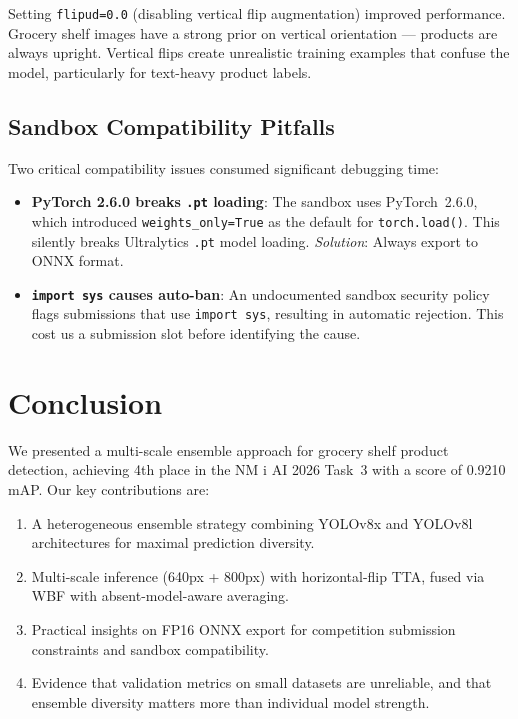 \documentclass[11pt,a4paper]{article}
\begin{document}
Setting \texttt{flipud=0.0} (disabling vertical flip augmentation) improved performance.
Grocery shelf images have a strong prior on vertical orientation --- products are always upright.
Vertical flips create unrealistic training examples that confuse the model, particularly for text-heavy product labels.

\subsection{Sandbox Compatibility Pitfalls}

Two critical compatibility issues consumed significant debugging time:
\begin{itemize}    \item \textbf{PyTorch 2.6.0 breaks \texttt{.pt} loading}: The sandbox uses PyTorch~2.6.0, which introduced \texttt{weights\_only=True} as the default for \texttt{torch.load()}.
    This silently breaks Ultralytics \texttt{.pt} model loading.
    \emph{Solution}: Always export to ONNX format.
    \item \textbf{\texttt{import sys} causes auto-ban}: An undocumented sandbox security policy flags submissions that use \texttt{import sys}, resulting in automatic rejection.
    This cost us a submission slot before identifying the cause.
\end{itemize}

\section{Conclusion}
\label{sec:conclusion}

We presented a multi-scale ensemble approach for grocery shelf product detection, achieving 4th place in the NM i AI 2026 Task~3 with a score of 0.9210 mAP.
Our key contributions are:
\begin{enumerate}    \item A heterogeneous ensemble strategy combining YOLOv8x and YOLOv8l architectures for maximal prediction diversity.
    \item Multi-scale inference (640px + 800px) with horizontal-flip TTA, fused via WBF with absent-model-aware averaging.
    \item Practical insights on FP16 ONNX export for competition submission constraints and sandbox compatibility.
    \item Evidence that validation metrics on small datasets are unreliable, and that ensemble diversity matters more than individual model strength.
\end{enumerate}
\end{document}
